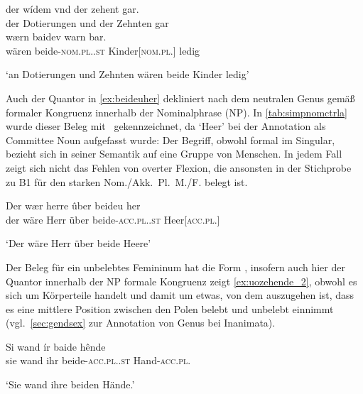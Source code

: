 \begin{exe}
\ex \label{ex:baideuwarn}
	\gll der wídem vnd der zehent gar. \\
		der Dotierungen und der Zehnten gar \\
\sn \gll wærn baidev warn bar. \\ %
		wären beide-\textsc{nom.pl.\NeutM.st} Kinder[\textsc{nom.pl.\NeutM}] ledig \\
	\begin{taggedline}{\parencites[\pno~75rb,3--4]{kc:C1}[vgl. abweichend][\pno~85vb,24]{kc:K}[][14384--14385]{schroeder1895}}
	\trans `an Dotierungen und Zehnten wären beide Kinder ledig'
	\end{taggedline}
\end{exe}

Auch der Quantor in \cref{ex:beideuher} dekliniert nach dem neutralen Genus
gemäß formaler Kongruenz innerhalb der Nominalphrase (NP). In
\cref{tab:simpnomctrla} wurde dieser Beleg mit \SA\ gekennzeichnet, da
 `Heer' bei der Annotation als Committee Noun
\autocite[211--213]{corbett2006} aufgefasst wurde: Der Begriff, obwohl formal
im Singular, bezieht sich in seiner Semantik auf eine Gruppe von Menschen. In
jedem Fall zeigt sich nicht das Fehlen von overter Flexion, die ansonsten in
der Stichprobe zu B1 für den starken Nom./Akk.~Pl.~M./F. belegt ist.

\begin{exe}
\ex \label{ex:beideuher}
	\gll Der wær herre ûber beideu her \\
		der wäre Herr über beide-\textsc{acc.pl.\NeutA.st} Heer[\textsc{acc.pl.\NeutA}] \\
	\begin{taggedline}{\parencites[\pno~31rc,3]{kc:B1}[zu][11272\psqq]{schroeder1895}} %
	\trans `Der wäre Herr über beide Heere'
	\end{taggedline}
\end{exe}

Der Beleg für ein unbelebtes Femininum hat die Form , insofern auch
hier der Quantor innerhalb der NP formale Kongruenz zeigt
\cref{ex:uozehende_2}, obwohl es sich um Körperteile handelt und damit um
etwas, von dem auszugehen ist, dass es eine mittlere Position zwischen den
Polen belebt und unbelebt einnimmt (vgl.~\cref{sec:gendsex} zur Annotation von
Genus bei Inanimata).

\begin{exe}
	\ex \gll Si wand ír baide hênde \\
			sie wand ihr beide-\textsc{acc.pl.\FemI.st} Hand-\textsc{acc.pl.\FemI} \\
		\begin{taggedline}{\parencites[\pno~6rb,19]{kc:K}[vgl.][913]{schroeder1895}}
		\trans `Sie wand ihre beiden Hände.'
		\end{taggedline}
		\label{ex:uozehende_2}
\end{exe}

